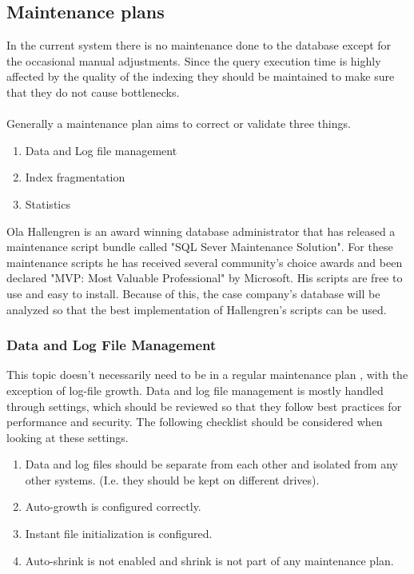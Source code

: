 \documentclass{cslthse-msc}
\begin{document}
\subsection{Maintenance plans}
In the current system there is no maintenance done to the database except for the occasional manual adjustments. Since the query execution time is highly affected by the quality of the indexing they should be maintained to make sure that they do not cause bottlenecks. \\\\
Generally a maintenance plan aims to correct or validate three things.
\begin{enumerate}
\item Data and Log file management
\item Index fragmentation
\item Statistics
\end{enumerate}

Ola Hallengren \cite{Hallengren15} is an award winning database administrator that has released a maintenance script bundle called "SQL Sever Maintenance Solution". For these maintenance scripts he has received several community's choice awards and been declared "MVP: Most Valuable Professional" by Microsoft. His scripts are free to use and easy to install. Because of this, the case company's database will be analyzed so that the best implementation of Hallengren's scripts can be used.

\subsubsection{Data and Log File Management}
This topic doesn't necessarily need to be in a regular maintenance plan \cite{Randal08}, with the exception of log-file growth. Data and log file management is mostly handled through settings, which should be reviewed so that they follow best practices for performance and security. The following checklist should be considered when looking at these settings.

\begin{enumerate}
\item Data and log files should be separate from each other and isolated from any other systems. (I.e. they should be kept on different drives).
\item Auto-growth is configured correctly.
\item Instant file initialization is configured.
\item Auto-shrink is not enabled and shrink is not part of any maintenance plan.
\end{enumerate}
\end{document}
